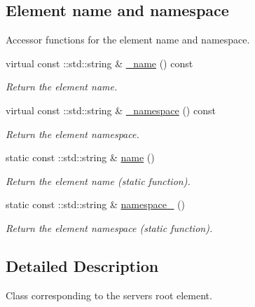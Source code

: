 \subsection*{Element name and namespace}
\label{_amgrpd4b5b61f6e07390f4af2465e04571f34}
Accessor functions for the element name and namespace. \begin{DoxyCompactItemize}
\item 
virtual const ::std::string \& \hyperlink{classopenstack_1_1xml_1_1Servers___ad69cf9e48e5bc1e160fd316446e9d25e}{\_\-name} () const 
\begin{DoxyCompactList}\small\item\em Return the element name. \item\end{DoxyCompactList}\item 
virtual const ::std::string \& \hyperlink{classopenstack_1_1xml_1_1Servers___ab38ab0a708ffa33c917c8e6397345333}{\_\-namespace} () const 
\begin{DoxyCompactList}\small\item\em Return the element namespace. \item\end{DoxyCompactList}\item 
static const ::std::string \& \hyperlink{classopenstack_1_1xml_1_1Servers___a7de5043332a7f92320077656a69f9ce1}{name} ()
\begin{DoxyCompactList}\small\item\em Return the element name (static function). \item\end{DoxyCompactList}\item 
static const ::std::string \& \hyperlink{classopenstack_1_1xml_1_1Servers___a7b116a6390d8069ed2a2c69b12cb8365}{namespace\_\-} ()
\begin{DoxyCompactList}\small\item\em Return the element namespace (static function). \item\end{DoxyCompactList}\end{DoxyCompactItemize}


\subsection{Detailed Description}
Class corresponding to the servers root element. 

